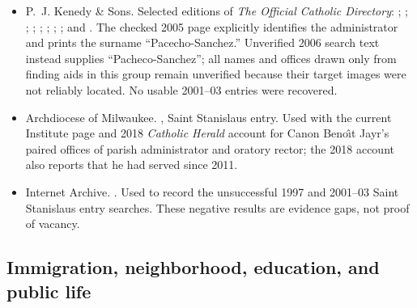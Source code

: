 \begin{itemize}[leftmargin=1.35em,itemsep=0.2em,topsep=0.2em]
\item P.~J. Kenedy \& Sons. Selected editions of \emph{The Official Catholic Directory}: ; ; ; ; ; ; ; ; and . The checked 2005 page explicitly identifies the administrator and prints the surname ``Pacecho-Sanchez.'' Unverified 2006 search text instead supplies ``Pacheco-Sanchez''; all names and offices drawn only from finding aids in this group remain unverified because their target images were not reliably located. No usable 2001--03 entries were recovered.
\item Archdiocese of Milwaukee. , Saint Stanislaus entry. Used with the current Institute page and 2018 \emph{Catholic Herald} account for Canon Beno\^{\i}t Jayr's paired offices of parish administrator and oratory rector; the 2018 account also reports that he had served since 2011.
\item Internet Archive. . Used to record the unsuccessful 1997 and 2001--03 Saint Stanislaus entry searches. These negative results are evidence gaps, not proof of vacancy.
\end{itemize}

\subsection{Immigration, neighborhood, education, and public life}

